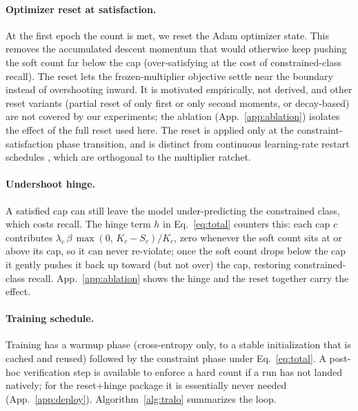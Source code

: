 \documentclass[10pt]{article}
\begin{document}
\paragraph{Optimizer reset at satisfaction.}
At the first epoch the count is met, we reset the Adam optimizer state. This
removes the accumulated descent momentum that would otherwise keep pushing
the soft count far below the cap (over-satisfying at the cost of
constrained-class recall). The reset lets the frozen-multiplier objective
settle near the boundary instead of overshooting inward. It is motivated
empirically, not derived, and other reset variants (partial reset of only
first or only second moments, or decay-based) are not covered by our
experiments; the ablation (App.~\ref{app:ablation}) isolates the effect of
the full reset used here. The reset is applied only at the
constraint-satisfaction phase transition, and is distinct from continuous
learning-rate restart schedules \citep{loshchilov2017sgdr}, which are
orthogonal to the multiplier ratchet.

\paragraph{Undershoot hinge.}
A satisfied cap can still leave the model under-predicting the constrained
class, which costs recall. The hinge term $h$ in Eq.~\eqref{eq:total}
counters this: each cap $c$ contributes
$\lambda_c\,\beta\,\max(0,\,K_c-S_c)/K_c$, zero whenever the soft count sits
at or above its cap, so it can never re-violate; once the soft count drops
below the cap it gently pushes it back up toward (but not over) the cap,
restoring constrained-class recall. App.~\ref{app:ablation} shows the hinge
and the reset together carry the effect.

\paragraph{Training schedule.}
Training has a warmup phase (cross-entropy only, to a stable initialization
that is cached and reused) followed by the constraint phase under
Eq.~\eqref{eq:total}. A post-hoc verification step is available to enforce a
hard count if a run has not landed natively; for the reset+hinge package it
is essentially never needed (App.~\ref{app:deploy}). Algorithm~\ref{alg:tralo}
summarizes the loop.
\end{document}
